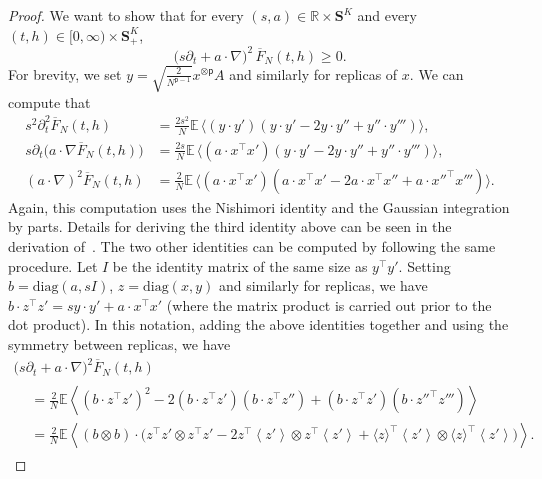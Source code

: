 \documentclass[10pt]{amsart}
\theoremstyle{definition}\newtheorem{defi}[theo]{Definition}\newtheorem{rema}[theo]{Remark}\newtheorem{exam}[theo]{Example}\newtheorem{exem}[theo]{Example}\newtheorem{nota}[theo]{Notation}
\newcommand{\R}{\mathbb{R}}
\newcommand{\E}{\mathbb{E}}
\renewcommand{\S}{\mathbf{S}}
\newcommand{\sfp}{\mathsf{p}}
\newcommand{\diagl}{\mathrm{diag}}
\renewcommand{\geq}{\geqslant}
\renewcommand{\bar}{\overline}
\newcommand{\la}{\left\langle}
\newcommand{\ra}{\right\rangle}
\begin{document}
\begin{proof}
We want to show that for every $(s,a)\in \R\times \S^K$ and every $(t,h)\in [0,\infty)\times \S^K_+$,
\begin{equation*}
\big(s\partial_t + a\cdot\nabla\big)^2\,\bar F_N(t,h)\geq 0.
\end{equation*}
For brevity, we set $y =\sqrt{\frac{2}{N^{\sfp-1}}} x^{\otimes \sfp}A$ and similarly for replicas of $x$. We can compute that
\begin{align*}
s^2 \partial_t^2 \bar F_N(t,h) &= \frac{2s^2}{N} \E \,\big\langle \left(y \cdot y'\right)\left(y\cdot y ' - 2 y\cdot y'' + y''\cdot y'''\right)\big\rangle,\\
s \partial_t \big(a\cdot\nabla\bar F_N(t,h)\big) &= \frac{2s}{N} \E \,\big\langle \left(a\cdot x^\intercal x'\right)\left(y\cdot y ' - 2 y\cdot y'' + y''\cdot y'''\right)\big\rangle,\\
(a\cdot\nabla)^2\bar F_N(t,h) &= \frac{2}{N} \E\,\big\langle \left(a\cdot x^\intercal x'\right)\left(a\cdot x^\intercal x' - 2a\cdot x^\intercal x'' +a\cdot x''^\intercal x'''\right)\big\rangle.
\end{align*}
Again, this computation uses the Nishimori identity and the Gaussian integration {by} parts. Details for deriving the third identity above can be seen in the derivation of~\cite[(3.27)]{mourrat2019hamilton}. The two other identities can be computed by following the same procedure. Let $I$ be the identity matrix of the same size as $y^\intercal y'$. Setting $b = \diagl(a,sI)$, $z=\diagl(x,y)$ and similarly for replicas, we have $b\cdot z^\intercal z' = sy\cdot y'+a\cdot x^\intercal x'$ (where the matrix product is carried out prior to the dot product). In this notation, adding the above identities together and using the symmetry between replicas, we have
\begin{multline*}
\big(s\partial_t + a\cdot\nabla\big)^2\bar F_N(t,h)\\
\begin{aligned}
&= \frac{2}{N}\E \la \left(b\cdot z^\intercal z'\right)^2 -2\left(b\cdot z^\intercal z'\right)\left(b\cdot z^\intercal z''\right) +\left(b\cdot z^\intercal z'\right)\left(b\cdot z''^\intercal z'''\right)\ra\\
&= \frac{2}{N}\E\la \left(b\otimes b\right)\cdot\big(z^\intercal z'\otimes z^\intercal z' - 2z^\intercal \left\langle z'\right\rangle \otimes z^\intercal \left\langle z'\right\rangle + \langle z\rangle^\intercal \left\langle z'\right\rangle \otimes \langle z\rangle^\intercal \left\langle z'\right\rangle\big) \ra.

\end{aligned}
\end{multline*}
\end{proof}
\end{document}
